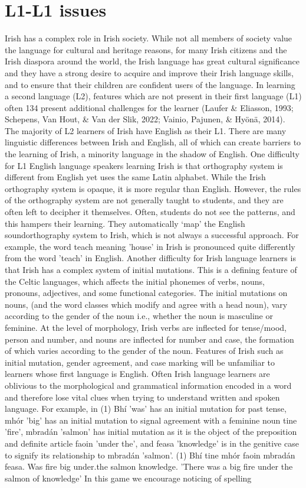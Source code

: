 \documentclass[10pt,twoside,english,a4paper]{article}
\begin{document}
\section{L1-L1 issues}
 Irish has a complex role in Irish society. While not all members of society value the language for cultural and heritage reasons, for many Irish citizens and the Irish diaspora around the world, the Irish language has great cultural significance and they have a strong desire to acquire and improve their Irish language skills, and to ensure that their children are confident users of the language. In learning a second language (L2), features which are not present in their first language (L1) often 134  present additional challenges for the learner (Laufer \& Eliasson, 1993; Schepens, Van Hout, \& Van der Slik, 2022; Vainio, Pajunen, \& Hyönä, 2014). The majority of L2 learners of Irish have English as their L1. There are many linguistic differences between Irish and English, all of which can create barriers to the learning of Irish, a minority language in the shadow of English. One difficulty for L1 English language speakers learning Irish is that orthography system is different from English yet uses the same Latin alphabet. While the Irish orthography system is opaque, it is more regular than English. However, the rules of the orthography system are not generally taught to students, and they are often left to decipher it themselves. Often, students do not see the patterns, and this hampers their learning. They automatically ‘map’ the English soundorthography system to Irish, which is not always a successful approach. For example, the word teach meaning 'house' in Irish is pronounced quite differently from the word 'teach' in English. Another difficulty for Irish language learners is that Irish has a complex system of initial mutations. This is a defining feature of the Celtic languages, which affects the initial phonemes of verbs, nouns, pronouns, adjectives, and some functional categories. The initial mutations on nouns, (and the word classes which modify and agree with a head noun), vary according to the gender of the noun i.e., whether the noun is masculine or feminine. At the level of morphology, Irish verbs are inflected for tense/mood, person and number, and nouns are inflected for number and case, the formation of which varies according to the gender of the noun. Features of Irish such as initial mutation, gender agreement, and case marking will be unfamiliar to learners whose first language is English. Often Irish language learners are oblivious to the morphological and grammatical information encoded in a word and therefore lose vital clues when trying to understand written and spoken language. For example, in (1) Bhí 'was' has an initial mutation for past tense, mhór 'big' has an initial mutation to signal agreement with a feminine noun tine 'fire', mbradán 'salmon' has initial mutation as it is the object of the preposition and definite article faoin 'under the', and feasa 'knowledge' is in the genitive case to signify its relationship to mbradán 'salmon'. (1) Bhí tine mhór faoin mbradán feasa. Was fire big under.the salmon knowledge. 'There was a big fire under the salmon of knowledge' In this game we encourage noticing of spelling 
\end{document}
